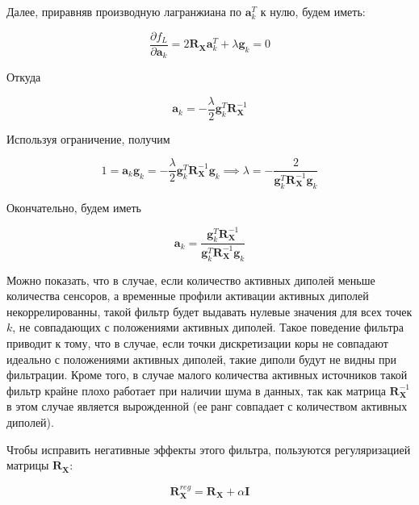 Далее, приравняв производную лагранжиана по $\mathbf{a}_k ^ T$ к нулю, будем иметь:

\begin{equation}
    \frac{\partial f_L}{\partial \mathbf{a}_k} = 
    2 \mathbf{R}_{\mathbf{X}} \mathbf{a}_k^T + \lambda \mathbf{g}_k = 0
\end{equation}

Откуда

\begin{equation}
    \mathbf{a}_k = - \frac{\lambda}{2} \mathbf{g}_k^T\mathbf{R}_{\mathbf{X}}^{-1}
\end{equation}

Используя ограничение, получим

\begin{equation}
    1 = \mathbf{a}_k \mathbf{g}_k =
    - \frac{\lambda}{2} \mathbf{g}_k^T\mathbf{R}_{\mathbf{X}}^{-1} \mathbf{g}_k \implies
    \lambda = -\frac{2}{\mathbf{g}_k^T \mathbf{R}_{\mathbf{X}}^{-1} \mathbf{g}_k}
\end{equation}

Окончательно, будем иметь

\begin{equation}
    \mathbf{a}_k =
    \frac{\mathbf{g}_k^T \mathbf{R}_{\mathbf{X}}^{-1}}{\mathbf{g}_k^T \mathbf{R}_{\mathbf{X}}^{-1} \mathbf{g}_k}
    \label{lcmv_filters}
\end{equation}

Можно показать, что в случае, если количество активных диполей меньше количества сенсоров,
а временные профили активации активных диполей некоррелированны,
такой фильтр будет выдавать нулевые значения для всех точек $k$, не совпадающих
с положениями активных диполей.
Такое поведение фильтра приводит к тому, что в случае, если точки дискретизации коры не
совпадают идеально с положениями активных диполей, такие диполи будут не видны при
фильтрации.
Кроме того, в случае малого количества активных источников такой фильтр
крайне плохо работает при наличии шума в данных, так как матрица $\mathbf{R}_{\mathbf{X}}^{-1}$
в этом случае является вырожденной (ее ранг совпадает с количеством активных диполей).

Чтобы исправить негативные эффекты этого фильтра, пользуются регуляризацией матрицы $\mathbf{R}_{\mathbf{X}}$:

\begin{equation}
    \mathbf{R}_{\mathbf{X}}^{reg} = \mathbf{R}_\mathbf{X} + \alpha \mathbf{I}
\end{equation}

